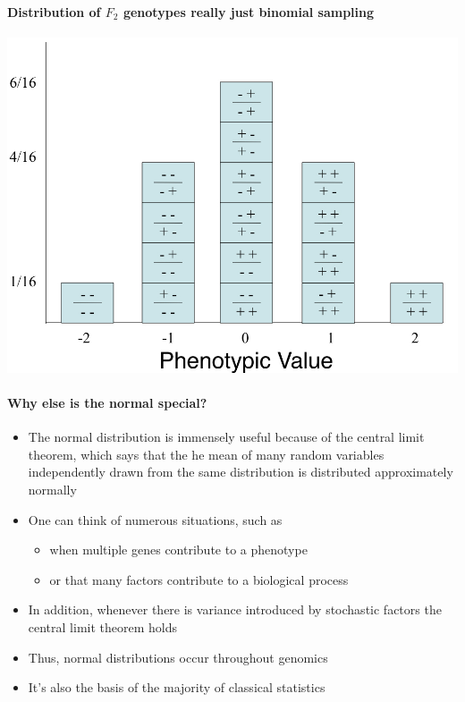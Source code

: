 \documentclass[]{book}
\providecommand{\tightlist}{%
  \setlength{\itemsep}{0pt}\setlength{\parskip}{0pt}}
\let\oldparagraph\paragraph
\renewcommand{\paragraph}[1]{\oldparagraph{#1}\mbox{}}
\begin{document}
\hypertarget{distribution-of-f_2-genotypes-really-just-binomial-sampling}{%
\paragraph{\texorpdfstring{Distribution of \(F_2\) genotypes \textbar{} really just binomial sampling}{Distribution of F\_2 genotypes \textbar{} really just binomial sampling}}\label{distribution-of-f_2-genotypes-really-just-binomial-sampling}}

\begin{center}\includegraphics[width=0.7\linewidth]{images/week_2.018} \end{center}

\hypertarget{why-else-is-the-normal-special}{%
\paragraph{Why else is the normal special?}\label{why-else-is-the-normal-special}}

\begin{itemize}
\tightlist
\item
  The normal distribution is immensely useful because of the central limit theorem, which says that the he mean of many random variables independently drawn from the same distribution is distributed approximately normally
\item
  One can think of numerous situations, such as

  \begin{itemize}
  \tightlist
  \item
    when multiple genes contribute to a phenotype
  \item
    or that many factors contribute to a biological process
  \end{itemize}
\item
  In addition, whenever there is variance introduced by stochastic factors the central limit theorem holds
\item
  Thus, normal distributions occur throughout genomics
\item
  It's also the basis of the majority of classical statistics
\end{itemize}
\end{document}
